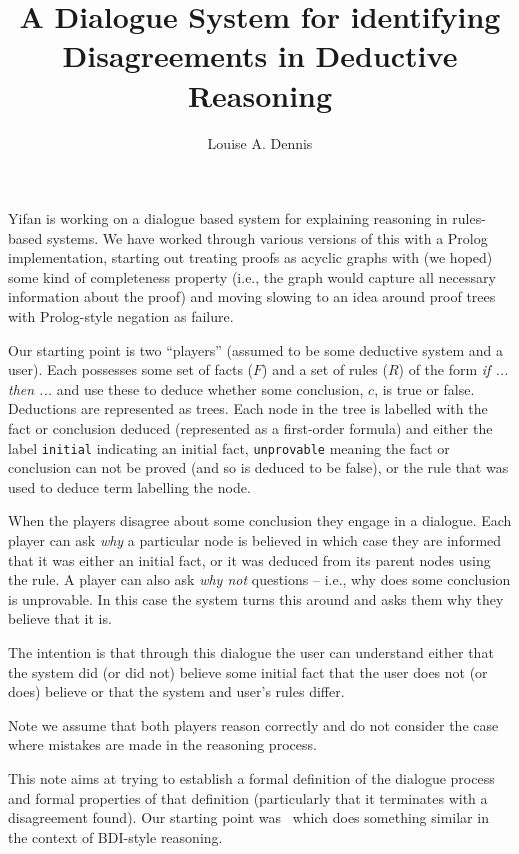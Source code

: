 \documentclass{blue-book}
\title{A Dialogue System for identifying Disagreements in Deductive Reasoning}
\author{Louise A. Dennis}
\begin{document}
\maketitle

Yifan is working on a dialogue based system for explaining reasoning in rules-based systems.  We have worked through various versions of this with a Prolog implementation, starting out treating proofs as acyclic graphs with (we hoped) some kind of completeness property (i.e., the graph would capture all necessary information about the proof) and moving slowing to an idea around proof trees with Prolog-style negation as failure.

Our starting point is two ``players'' (assumed to be some deductive system and a user).  Each possesses some set of facts ($F$) and a set of rules ($R$) of the form \emph{if ...  then ...} and use these to deduce whether some conclusion, $c$, is true or false.  Deductions are represented as trees.  Each node in the tree is labelled with the fact or conclusion deduced (represented as a first-order formula) and either the label \texttt{initial} indicating an initial fact, \texttt{unprovable} meaning the fact or conclusion can not be proved (and so is deduced to be false), or the rule that was used to deduce term labelling the node. 

When the players disagree about some conclusion they engage in a dialogue.  Each player can ask \emph{why} a particular node is believed in which case they are informed that it was either an initial fact, or it was deduced from its parent nodes using the rule.  A player can also ask \emph{why not} questions -- i.e., why does some conclusion is unprovable.  In this case the system turns this around and asks them why they believe that it is.

The intention is that through this dialogue the user can understand either that the system did (or did not) believe some initial fact that the user does not (or does) believe or that the system and user's rules differ.

Note we assume that both players reason correctly and do not consider the case where mistakes are made in the reasoning process.

\begin{sloppypar}
This note aims at trying to establish a formal definition of the dialogue process and formal properties of that definition (particularly that it terminates with a disagreement found).  Our starting point was~\cite{DennisAAMAS21} which does something similar in the context of BDI-style reasoning.
\end{sloppypar}
\end{document}
